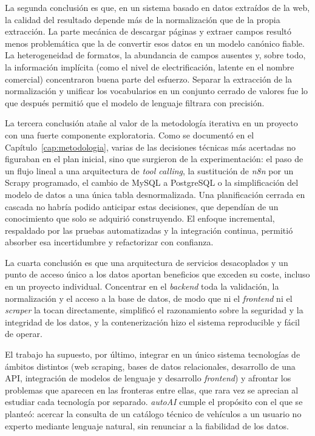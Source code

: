 La segunda conclusión es que, en un sistema basado en datos extraídos de la web,
la calidad del resultado depende más de la normalización que de la propia
extracción. La parte mecánica de descargar páginas y extraer campos resultó menos
problemática que la de convertir esos datos en un modelo canónico fiable. La
heterogeneidad de formatos, la abundancia de campos ausentes y, sobre todo, la
información implícita (como el nivel de electrificación, latente en el nombre
comercial) concentraron buena parte del esfuerzo. Separar la extracción de la
normalización y unificar los vocabularios en un conjunto cerrado de valores fue lo
que después permitió que el modelo de lenguaje filtrara con precisión.

La tercera conclusión atañe al valor de la metodología iterativa en un proyecto con
una fuerte componente exploratoria. Como se documentó en el
Capítulo~\ref{cap:metodologia}, varias de las decisiones técnicas más acertadas no
figuraban en el plan inicial, sino que surgieron de la experimentación: el paso de
un flujo lineal a una arquitectura de \emph{tool calling}, la sustitución de
\emph{n8n} por un Scrapy programado, el cambio de MySQL a PostgreSQL o la
simplificación del modelo de datos a una única tabla desnormalizada. Una
planificación cerrada en cascada no habría podido anticipar estas decisiones, que
dependían de un conocimiento que solo se adquirió construyendo. El enfoque
incremental, respaldado por las pruebas automatizadas y la integración continua,
permitió absorber esa incertidumbre y refactorizar con confianza.

La cuarta conclusión es que una arquitectura de servicios desacoplados y un punto
de acceso único a los datos aportan beneficios que exceden su coste, incluso en un
proyecto individual. Concentrar en el \emph{backend} toda la validación, la
normalización y el acceso a la base de datos, de modo que ni el \emph{frontend} ni
el \emph{scraper} la tocan directamente, simplificó el razonamiento sobre la
seguridad y la integridad de los datos, y la contenerización hizo el sistema
reproducible y fácil de operar.

El trabajo ha supuesto, por último, integrar en un único sistema tecnologías de
ámbitos distintos (web scraping, bases de datos relacionales, desarrollo de una
API, integración de modelos de lenguaje y desarrollo \emph{frontend}) y afrontar
los problemas que aparecen en las fronteras entre ellas, que rara vez se aprecian
al estudiar cada tecnología por separado. \emph{autoAI} cumple el propósito con el
que se planteó: acercar la consulta de un catálogo técnico de vehículos a un
usuario no experto mediante lenguaje natural, sin renunciar a la fiabilidad de los
datos.

